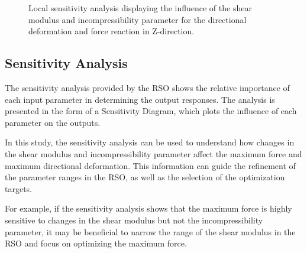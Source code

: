 \begin{figure}%
    \centering
	\caption[Local sensitivity analysis - Initial parameter range]{Local sensitivity analysis displaying the influence of the shear modulus and incompressibility parameter for the directional deformation and force reaction in Z-direction.}%
	\label{fig:fullrangelocalsensi}%
 \end{figure}



 



\subsection{Sensitivity Analysis}

The sensitivity analysis provided by the RSO shows the relative importance of each input parameter in determining the output responses. The analysis is presented in the form of a Sensitivity Diagram, which plots the influence of each parameter on the outputs.

In this study, the sensitivity analysis can be used to understand how changes in the shear modulus and incompressibility parameter affect the maximum force and maximum directional deformation. This information can guide the refinement of the parameter ranges in the RSO, as well as the selection of the optimization targets.

For example, if the sensitivity analysis shows that the maximum force is highly sensitive to changes in the shear modulus but not the incompressibility parameter, it may be beneficial to narrow the range of the shear modulus in the RSO and focus on optimizing the maximum force.


